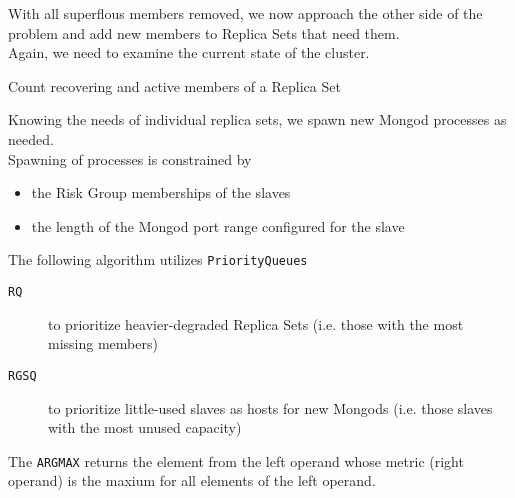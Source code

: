 With all superflous members removed, we now approach the other side of the problem
and add new members to Replica Sets that need them.\\
Again, we need to examine the current state of the cluster.

\begin{algorithm}[H]
\caption{Count recovering and active members of a Replica Set}
\label{alg:AlreadyAddedMemberCount}
\BlankLine
{}
\end{algorithm}

Knowing the needs of individual replica sets, we spawn new Mongod processes as needed.\\
Spawning of processes is constrained by
\begin{itemize}
  \item the Risk Group memberships of the slaves
  \item the length of the Mongod port range configured for the slave
\end{itemize}

The following algorithm utilizes \texttt{PriorityQueues}
\begin{description}
  \item[\texttt{RQ}] to prioritize heavier-degraded Replica Sets (i.e. those with the most missing members)
  \item[\texttt{RGSQ}] to prioritize little-used slaves as hosts for new Mongods (i.e. those slaves with the most unused capacity)
\end{description} 

The \texttt{ARGMAX} returns the element from the left operand whose metric (right operand) is the maxium for all elements of the left operand.

